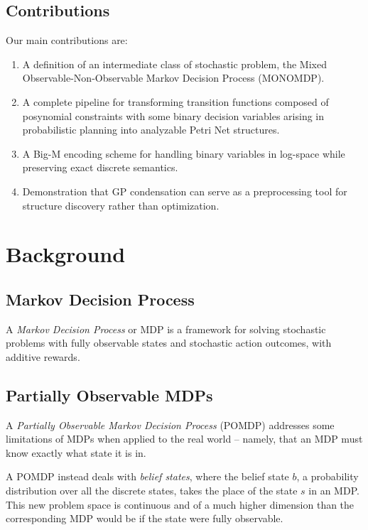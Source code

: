 \documentclass[11pt]{article}
\begin{document}
\subsection{Contributions}

Our main contributions are:

\begin{enumerate}
\item A definition of an intermediate class of stochastic problem, the
  Mixed Observable-Non-Observable Markov Decision Process (MONOMDP).
\item A complete pipeline for transforming transition functions
  composed of posynomial constraints with some binary decision
  variables arising in probabilistic planning into analyzable Petri
  Net structures.
\item A Big-M encoding scheme for handling binary variables in
  log-space while preserving exact discrete semantics.
\item Demonstration that GP condensation can serve as a preprocessing
  tool for structure discovery rather than optimization.
\end{enumerate}

\section{Background}

\subsection{Markov Decision Process}

A \emph{Markov Decision Process} or MDP is a framework for solving
stochastic problems with fully observable states and stochastic action
outcomes, with additive rewards.

\subsection{Partially Observable MDPs}

A \emph{Partially Observable Markov Decision Process} (POMDP)
addresses some limitations of MDPs when applied to the real world --
namely, that an MDP must know exactly what state it is in.

A POMDP instead deals with \emph{belief states}, where the belief
state $b$, a probability distribution over all the discrete states,
takes the place of the state $s$ in an MDP. This new problem space is
continuous and of a much higher dimension than the corresponding MDP
would be if the state were fully observable.
\end{document}
